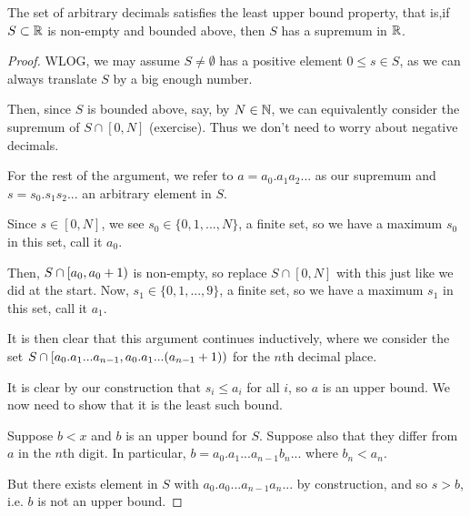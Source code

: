 \documentclass[11pt]{article}
\begin{document}
\begin{theorem}
  The set of arbitrary decimals satisfies the least upper bound property, that is,if \(S \subset \mathbb{R}\) is non-empty and bounded above, then \(S\) has a supremum in \(\mathbb{R}\).
\end{theorem}
\begin{proof}
  WLOG, we may assume \(S\neq\emptyset\) has a positive element \(0\leq s\in S\), as we can always translate \(S\) by a big enough number.

  Then, since \(S\) is bounded above, say, by \(N\in\mathbb{N}\), we can equivalently consider the supremum of \(S\cap [0,N]\) (exercise). Thus we don't need to worry about negative decimals.

  For the rest of the argument, we refer to \(a=a_0.a_1a_2...\) as our supremum and \(s=s_0.s_1s_2...\) an arbitrary element in \(S\).

  Since \(s\in [0,N]\), we see \(s_0\in\{0,1,...,N\}\), a finite set, so we have a maximum \(s_0\) in this set, call it \(a_0\).

  Then, \(S\cap \left[a_0,a_0+1\right)\) is non-empty, so replace \(S\cap [0,N]\) with this just like we did at the start. Now, \(s_1\in\{0,1,...,9\}\), a finite set, so we have a maximum \(s_1\) in this set, call it \(a_1\).

  It is then clear that this argument continues inductively, where we consider the set \(S\cap \left[a_0.a_1...a_{n-1},a_0.a_1...(a_{n-1}+1)\right)\) for the \(n\)th decimal place.

  It is clear by our construction that \(s_i \leq a_i\) for all \(i\), so \(a\) is an upper bound. We now need to show that it is the least such bound.

  Suppose \(b<x\) and \(b\) is an upper bound for \(S\). Suppose also that they differ from \(a\) in the \(n\)th digit. In particular, \(b=a_0.a_1...a_{n-1}b_n...\) where \(b_n<a_n\).

  But there exists element in \(S\) with \(a_0.a_0...a_{n-1}a_n...\) by construction, and so \(s>b\), i.e. \(b\) is not an upper bound.
\end{proof}
\end{document}
